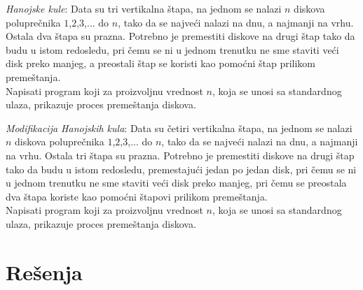 \begin{Exercise}[label=117]
{\em Hanojske kule}: Data su tri
  vertikalna štapa, na jednom se nalazi $n$ diskova poluprečnika
  $1$,$2$,$3$,... do $n$, tako da se najveći nalazi na dnu, a
  najmanji na vrhu. Ostala dva štapa su prazna. Potrebno je
  premestiti diskove na drugi štap tako da budu u istom redosledu, pri čemu se ni u jednom
  trenutku ne sme staviti veći disk preko manjeg, a preostali štap se koristi kao pomoćni štap prilikom
  premeštanja. \\
  Napisati program koji za proizvoljnu vrednost $n$, koja se unosi sa standardnog ulaza, prikazuje proces premeštanja diskova.

\end{Exercise}

\begin{Exercise}[label=118]
{\em Modifikacija Hanojskih kula}: Data su četiri
  vertikalna štapa, na jednom se nalazi $n$ diskova poluprečnika
  $1$,$2$,$3$,... do $n$, tako da se najveći nalazi na dnu, a
  najmanji na vrhu. Ostala tri štapa su prazna. Potrebno je
  premestiti diskove na drugi štap tako da budu u istom redosledu,
  premestajući jedan po jedan disk, pri čemu se ni u jednom
  trenutku ne sme staviti veći disk preko manjeg, pri čemu se
  preostala dva štapa koriste kao pomoćni štapovi prilikom
  premeštanja.\\
  Napisati program koji za proizvoljnu vrednost $n$, koja se unosi sa standardnog ulaza, prikazuje proces premeštanja diskova.

\end{Exercise}


\section{Rešenja}
\shipoutAnswer
